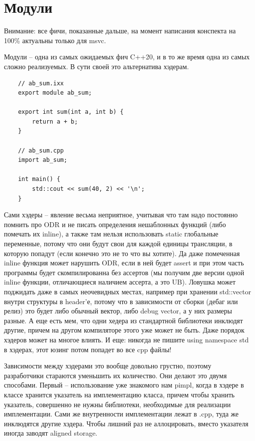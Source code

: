 \documentclass[12pt, a4paper]{article}
\begin{document}
\section{Модули}
Внимание: все фичи, показанные дальше, на момент написания конспекта на 100\% актуальны только для msvc.\\
\par Модули -- одна из самых ожидаемых фич C++20, и в то же время одна из самых сложно реализуемых. В сути своей это альтернатива хэдерам.
\begin{verbatim}
	// ab_sum.ixx
	export module ab_sum;
	
	export int sum(int a, int b) {
		return a + b;
	}
	
	// ab_sum.cpp
	import ab_sum;
	
	int main() {
		std::cout << sum(40, 2) << '\n';
	}
\end{verbatim}
Сами хэдеры -- явление весьма неприятное, учитывая что там надо постоянно помнить про ODR и не писать определения нешаблонных функций (либо помечать их inline), а также там нельзя использовать static глобальные переменные, потому что они будут свои для каждой единицы трансляции, в которую попадут (если конечно это не то что вы хотите). Да даже помеченная inline функция может нарушить ODR, если в ней будет assert и при этом часть программы будет скомпилированна без ассертов (мы получим две версии одной inline функции, отличающиеся наличием ассерта, а это UB). Ловушка может поджидать даже в самых неочевидных местах, например при хранении std::vector внутри структуры в header'е, потому что в зависимости от сборки (дебаг или релиз) это будет либо обычный вектор, либо debug vector, а у них размеры разные. А еще есть мем, что одни хедера из стандартной библиотеки инклюдят другие, причем на другом компиляторе этого уже может не быть. Даже порядок хэдеров может на многое влиять. И еще: никогда не пишите using namespace std в хэдерах, этот юзинг потом попадет во все cpp файлы!
\par Зависимости между хэдерами это вообще довольно грустно, поэтому разработчики стараются уменьшить их количество. Они делают это двумя способами. Первый -- использование уже знакомого нам pimpl, когда в хэдере в классе хранится указатель на имплементацию класса, причем чтобы хранить указатель, совершенно не нужны библиотеки, необходимые для реализации имплементации. Сами же внутренности имплементации лежат в .cpp, туда же инклюдятся другие хэдера. Чтобы лишний раз не аллоцировать, вместо указателя иногда заводят aligned storage.
\end{document}
